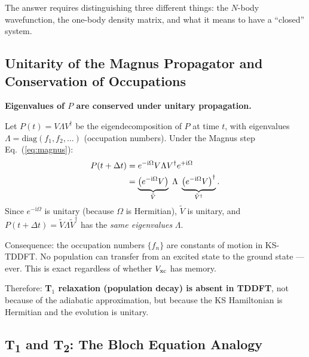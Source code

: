\documentclass[12pt,letterpaper]{article}
\newcommand{\ii}{\mathrm{i}}
\theoremstyle{definition}
\begin{document}
The answer requires distinguishing three different things:
the $N$-body wavefunction, the one-body density matrix, and what
it means to have a ``closed'' system.

\subsection{Unitarity of the Magnus Propagator and Conservation of Occupations}

\begin{derivbox}
\textbf{Eigenvalues of $P$ are conserved under unitary propagation.}

Let $P(t) = V\Lambda V^\dagger$ be the eigendecomposition of $P$ at time $t$,
with eigenvalues $\Lambda = \mathrm{diag}(f_1, f_2, \ldots)$ (occupation numbers).
Under the Magnus step Eq.~(\ref{eq:magnus}):
\begin{align}
  P(t+\Delta t)
  &= e^{-\ii\Omega}V\Lambda V^\dagger e^{+\ii\Omega} \notag \\
  &= \underbrace{\left(e^{-\ii\Omega}V\right)}_{\tilde{V}}
     \;\Lambda\;
     \underbrace{\left(e^{-\ii\Omega}V\right)^\dagger}_{\tilde{V}^\dagger}.
\end{align}
Since $e^{-\ii\Omega}$ is unitary (because $\Omega$ is Hermitian),
$\tilde{V}$ is unitary, and $P(t+\Delta t) = \tilde{V}\Lambda\tilde{V}^\dagger$
has the \emph{same eigenvalues} $\Lambda$.

Consequence: the occupation numbers $\{f_n\}$ are constants of motion in
KS-TDDFT.  No population can transfer from an excited state to the
ground state --- ever.  This is exact regardless of whether
$V_{\rm xc}$ has memory.
\end{derivbox}

Therefore: \textbf{T$_1$ relaxation (population decay) is absent in
TDDFT}, not because of the adiabatic approximation, but because the
KS Hamiltonian is Hermitian and the evolution is unitary.

\subsection{T\textsubscript{1} and T\textsubscript{2}: The Bloch Equation Analogy}
\end{document}
